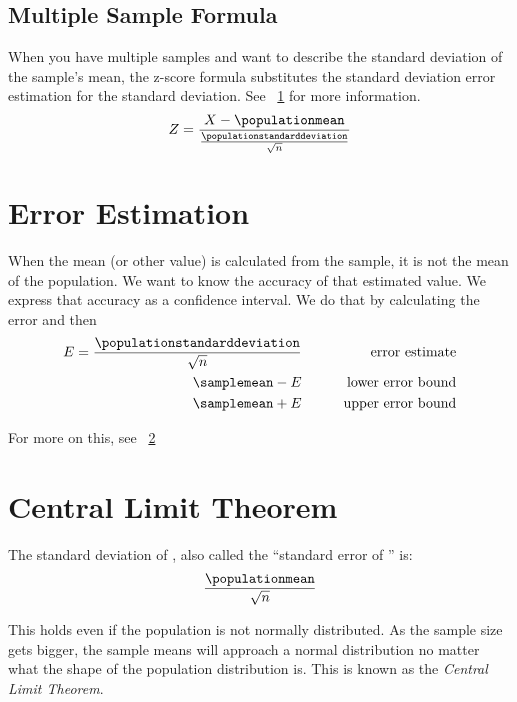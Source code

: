 \documentclass{article}
\begin{document}
	\subsection{Multiple Sample Formula}
When you have multiple samples and want to describe the standard deviation of the sample's mean, the z-score formula substitutes the standard deviation error estimation for the standard deviation.  See \sectionname~\ref{sec:errorestimation} for more information.
	\begin{equation}
		Z = \frac{X-\populationmean}{\frac{\populationstandarddeviation}{\sqrt{n}}	}
	\end{equation}

	\section{Error Estimation}
	\label{sec:errorestimation}
When the mean (or other value) is calculated from the sample, it is not the mean of the population.  We want to know the accuracy of that estimated value.  We express that accuracy as a confidence interval.  We do that by calculating the error and then
	\begin{eqnarray}
		E = \frac{\populationstandarddeviation}{\sqrt{n}}	& \quad\quad & \text{error estimate}	\\
		\samplemean - E								& 		& \text{lower error bound}				\\
		\samplemean + E								& 		& \text{upper error bound}
	\end{eqnarray}
	\begin{mathwhere}[0.38in]
	\end{mathwhere}
For more on this, see \sectionname~\ref{sec:centrallimittheorem}

	\section{Central Limit Theorem}
	\label{sec:centrallimittheorem}
The standard deviation of \samplemean{}, also called the ``standard error of \samplemean{}'' is:
	\begin{equation}
		\frac{\populationmean}{\sqrt{n}}
	\end{equation}
	\begin{mathwhere}
	\end{mathwhere}
This holds even if the population is not normally distributed.  As the sample size gets bigger, the sample means will approach a normal distribution no matter what the shape of the population distribution is.  This is known as the \textit{Central Limit Theorem}.
\end{document}
